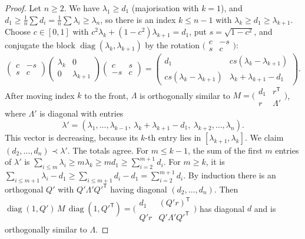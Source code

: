 \begin{proof}
Let $n\ge2$. We have $\lambda_1\ge d_1$ (majorisation with $k=1$), and $d_1\ge\frac1n\sum d_i=\frac1n\sum\lambda_i\ge
\lambda_n$, so there is an index $k\le n-1$ with $\lambda_k\ge d_1\ge\lambda_{k+1}$. Choose $c\in[0,1]$ with
$c^2\lambda_k+(1-c^2)\lambda_{k+1}=d_1$, put $s=\sqrt{1-c^2}$, and conjugate the block $\operatorname{diag}(\lambda_k,
\lambda_{k+1})$ by the rotation $\bigl(\begin{smallmatrix}c&-s\\s&c\end{smallmatrix}\bigr)$:
\[
\begin{pmatrix}c&-s\\s&c\end{pmatrix}\begin{pmatrix}\lambda_k&0\\0&\lambda_{k+1}\end{pmatrix}\begin{pmatrix}c&s\\-s&c\end{pmatrix}
=\begin{pmatrix}d_1&cs(\lambda_k-\lambda_{k+1})\\cs(\lambda_k-\lambda_{k+1})&\lambda_k+\lambda_{k+1}-d_1\end{pmatrix}.
\]
After moving index $k$ to the front, $\Lambda$ is orthogonally similar to $M=\bigl(\begin{smallmatrix}d_1&r^{\mathsf T}\\r&
\Lambda'\end{smallmatrix}\bigr)$, where $\Lambda'$ is diagonal with entries
\[
\lambda'=(\lambda_1,\dots,\lambda_{k-1},\ \lambda_k+\lambda_{k+1}-d_1,\ \lambda_{k+2},\dots,\lambda_n).
\]
This vector is decreasing, because its $k$-th entry lies in $[\lambda_{k+1},\lambda_k]$. We claim $(d_2,\dots,d_n)\prec
\lambda'$. The totals agree. For $m\le k-1$, the sum of the first $m$ entries of $\lambda'$ is $\sum_{i\le m}\lambda_i\ge
m\lambda_k\ge md_1\ge\sum_{i=2}^{m+1}d_i$. For $m\ge k$, it is $\sum_{i\le m+1}\lambda_i-d_1\ge\sum_{i\le m+1}d_i-d_1=
\sum_{i=2}^{m+1}d_i$. By induction there is an orthogonal $Q'$ with $Q'\Lambda'Q'^{\mathsf T}$ having diagonal $(d_2,\dots,
d_n)$. Then $\operatorname{diag}(1,Q')\,M\,\operatorname{diag}(1,Q'^{\mathsf T})=\bigl(\begin{smallmatrix}d_1&(Q'r)^{\mathsf
T}\\Q'r&Q'\Lambda'Q'^{\mathsf T}\end{smallmatrix}\bigr)$ has diagonal $d$ and is orthogonally similar to $\Lambda$.
\end{proof}

